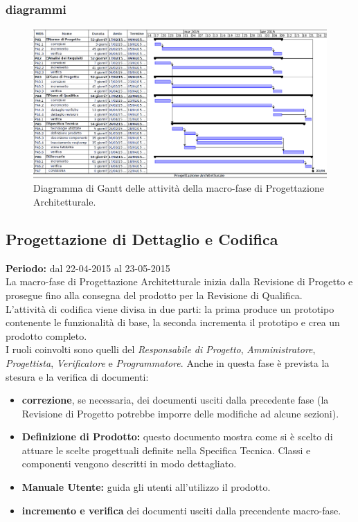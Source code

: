 \newpage
\subsubsection{diagrammi}

\begin{figure}[h]
\begin{center}
\includegraphics[width=\textwidth, height=\textheight, keepaspectratio]{img/progarc-gantt.png}
\caption{Diagramma di Gantt delle attività della macro-fase di Progettazione Architetturale.}
\end{center}
\end{figure}
\clearpage

\subsection{Progettazione di Dettaglio e Codifica}
\textbf{Periodo:} dal 22-04-2015 al 23-05-2015 \\
La macro-fase di Progettazione Architetturale inizia dalla Revisione di Progetto e prosegue fino alla consegna del prodotto per la Revisione di Qualifica. \\
L'attività di codifica viene divisa in due parti: la prima produce un prototipo contenente le funzionalità di base, la seconda incrementa il prototipo e crea un prodotto completo. \\
I ruoli coinvolti sono quelli del \textit{Responsabile di Progetto}, \textit{Amministratore}, \textit{Progettista}, \textit{Verificatore} e \textit{Programmatore}.
Anche in questa fase è prevista la stesura e la verifica di documenti:
\begin{itemize}
\item \textbf{correzione}, se necessaria, dei documenti usciti dalla precedente fase (la Revisione di Progetto potrebbe imporre delle modifiche ad alcune sezioni).
\item \textbf{Definizione di Prodotto:} questo documento mostra come si è scelto di attuare le scelte progettuali definite nella Specifica Tecnica. Classi e componenti vengono descritti in modo dettagliato.
\item \textbf{Manuale Utente:} guida gli utenti all'utilizzo il prodotto.
\item \textbf{incremento e verifica} dei documenti usciti dalla precendente macro-fase.
\end{itemize}

